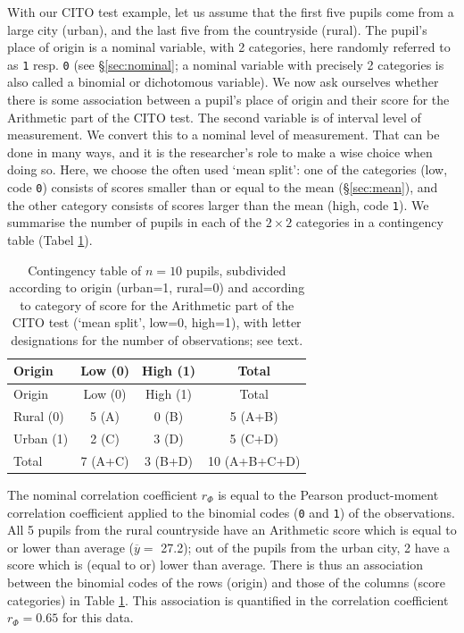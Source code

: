 \documentclass[
]{book}
\begin{document}
With our CITO test example, let us assume that the first five
pupils come from a large city (urban), and the last five from the
countryside (rural). The pupil's place of origin is a nominal variable,
with 2 categories, here randomly referred to as \texttt{1} resp. \texttt{0} (see
§\ref{sec:nominal}; a nominal variable with precisely 2
categories is also called a binomial or dichotomous variable).
We now ask ourselves whether there is some association between a
pupil's place of origin and their score for the Arithmetic part of the CITO test.
The second variable is of interval level of measurement. We convert this to a
nominal level of measurement. That can be done in many ways, and it is the
researcher's role to make a wise choice when doing so. Here, we
choose the often used `mean split': one of the categories (low, code \texttt{0})
consists of scores smaller than or equal to the mean
(§\ref{sec:mean}), and the other category consists of scores larger
than the mean (high, code \texttt{1}). We summarise the number of pupils in each of the
\(2\times 2\) categories in a contingency table
(Tabel \ref{tab:cito-contingency-table}).

\begin{longtable}[]{@{}lccc@{}}
\caption{\label{tab:cito-contingency-table} Contingency table of \(n=10\) pupils, subdivided according
to origin (urban=1, rural=0) and according to category of score for the Arithmetic part of
the CITO test (`mean split', low=0, high=1), with letter designations for the number
of observations; see text.}\tabularnewline
\toprule
Origin & Low (0) & High (1) & Total \\
\midrule
\endfirsthead
\toprule
Origin & Low (0) & High (1) & Total \\
\midrule
\endhead
Rural (0) & 5 (A) & 0 (B) & 5 (A+B) \\
Urban (1) & 2 (C) & 3 (D) & 5 (C+D) \\
Total & 7 (A+C) & 3 (B+D) & 10 (A+B+C+D) \\
\bottomrule
\end{longtable}

The nominal correlation coefficient \(r_\Phi\) is equal to the Pearson
product-moment correlation coefficient applied to the binomial codes
(\texttt{0} and \texttt{1}) of the observations. All 5 pupils from the rural countryside
have an Arithmetic score which is equal to or lower than average
(\(\overline{y}=\) 27.2); out of the pupils from the urban city, 2 have a
score which is (equal to or) lower than average. There is thus an association\\
between the binomial codes of the rows (origin) and those of the columns
(score categories) in Table \ref{tab:cito-contingency-table}.
This association is quantified in the
correlation coefficient \(r_\Phi=0.65\) for this data.
\end{document}
